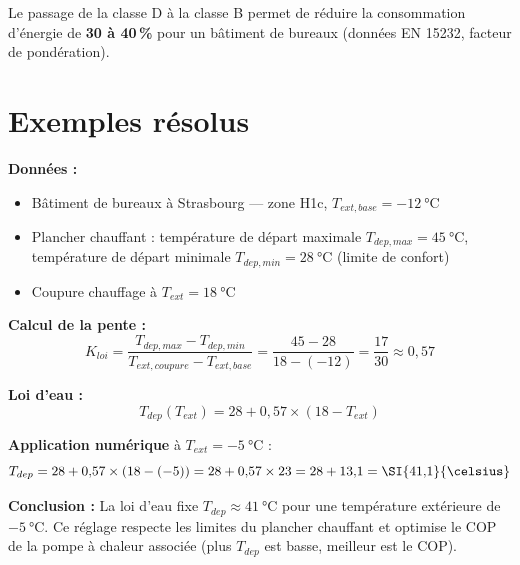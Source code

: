 Le passage de la classe D à la classe B permet de réduire la consommation d'énergie de \textbf{30 à 40\,\%} pour un bâtiment de bureaux (données EN 15232, facteur de pondération).

\section{Exemples résolus}

\begin{exemple}[title={Calcul de la loi d'eau pour plancher chauffant}]
  \textbf{Données :}
  \begin{itemize}
    \item Bâtiment de bureaux à Strasbourg — zone H1c, $T_{ext,base} = \SI{-12}{\celsius}$
    \item Plancher chauffant : température de départ maximale $T_{dep,max} = \SI{45}{\celsius}$, température de départ minimale $T_{dep,min} = \SI{28}{\celsius}$ (limite de confort)
    \item Coupure chauffage à $T_{ext} = \SI{18}{\celsius}$
  \end{itemize}

  \textbf{Calcul de la pente :}
  \begin{equation}
    K_{loi} = \frac{T_{dep,max} - T_{dep,min}}{T_{ext,coupure} - T_{ext,base}} = \frac{45 - 28}{18 - (-12)} = \frac{17}{30} \approx 0{,}57
  \end{equation}

  \textbf{Loi d'eau :}
  \begin{equation}
    T_{dep}(T_{ext}) = 28 + 0{,}57 \times (18 - T_{ext})
  \end{equation}

  \textbf{Application numérique} à $T_{ext} = \SI{-5}{\celsius}$ :
  \begin{equation}
    T_{dep} = 28 + 0{,}57 \times (18 - (-5)) = 28 + 0{,}57 \times 23 = 28 + 13{,}1 = \SI{41{,}1}{\celsius}
  \end{equation}

  \textbf{Conclusion :} La loi d'eau fixe $T_{dep} \approx \SI{41}{\celsius}$ pour une température extérieure de $\SI{-5}{\celsius}$. Ce réglage respecte les limites du plancher chauffant et optimise le COP de la pompe à chaleur associée (plus $T_{dep}$ est basse, meilleur est le COP).
\end{exemple}

